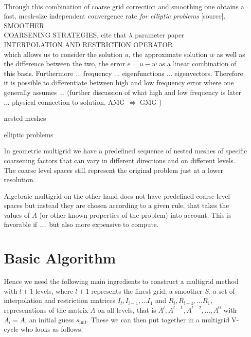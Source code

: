 \documentclass[../draft_1.tex]{subfiles}
\begin{document}
\smallskip
\\
Through this combination of coarse grid correction and smoothing one obtains a fast, mesh-size independent convergence rate \textit{for elliptic problems} [source].
\smallskip
\\
SMOOTHER
\smallskip
\\
COARSENING STRATEGIES, cite that $\lambda$ parameter paper
\smallskip
\\
INTERPOLATION AND RESTRICTION OPERATOR
\smallskip
\\
which allows us to consider the solution $u$, the approximate solution $w$ as well as the difference between the two, the error $ e = u - w$ as a linear combination of this basis. Furthermore ... frequency ... eigenfunctions ... eigenvectors. Therefore it is possible to differentiate between high and low frequency error where one generally assumes ... (further discussion of what high and low frequency is later ... physical connection to solution, AMG $ \iff $ GMG )



nested meshes

elliptic problems


In geometric multigrid we have a predefined sequence of nested meshes of specific coarsening factors that can vary in different directions and on different levels. The coarse level spaces still represent the original problem just at a lower resolution. 

Algebraic multigrid on the other hand does not have predefined coarse level spaces but instead they are chosen according to a given rule, that takes the values of $A$ (or other known properties of the problem) into account. This is favorable if .... but also more expensive to compute. 


\section{Basic Algorithm} 


Hence we need the following main ingredients to construct a multigrid method with $l+1$ levels, where $l+1$ represents the finest grid; a smoother $S$, a set of interpolation and restriction matrices $I_l, I_{l-1}, ...I_1$ and $R_l, R_{l-1}, ... R_1$, represenations of the matrix $A$ on all levels, that is $A^l, A^{l-1}, A^{l-2}, ..., A^0$ with $A_l = A$, an initial guess $s_{\text{init}}$. These we can then put together in a multigrid V-cycle who looks as follows. 
\end{document}
